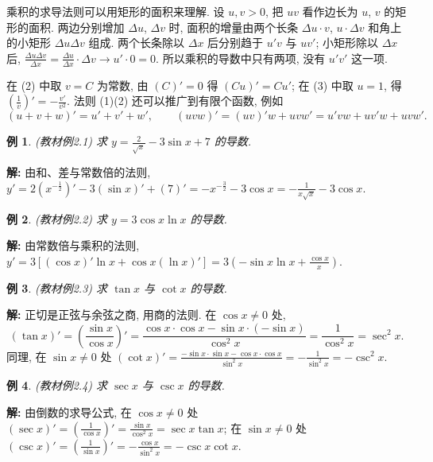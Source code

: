 \documentclass[UTF8,openany]{ctexbook}
\theoremstyle{chinesetextbook}
\newtheorem{example}{例}[section]
\newenvironment{cnsolution}{\par\indent\textbf{解:} \ignorespaces}{\par}
\begin{document}
乘积的求导法则可以用矩形的面积来理解. 设 $u,v>0$, 把 $uv$ 看作边长为 $u$, $v$ 的矩形的面积. 两边分别增加 $\Delta u$, $\Delta v$ 时, 面积的增量由两个长条 $\Delta u\cdot v$, $u\cdot\Delta v$ 和角上的小矩形 $\Delta u\Delta v$ 组成. 两个长条除以 $\Delta x$ 后分别趋于 $u'v$ 与 $uv'$; 小矩形除以 $\Delta x$ 后, $\displaystyle\frac{\Delta u\Delta v}{\Delta x}=\frac{\Delta u}{\Delta x}\cdot\Delta v\to u'\cdot0=0$. 所以乘积的导数中只有两项, 没有 $u'v'$ 这一项.

在 (2) 中取 $v=C$ 为常数, 由 $(C)'=0$ 得 $(Cu)'=Cu'$; 在 (3) 中取 $u=1$, 得 $\displaystyle\left(\frac1v\right)'=-\frac{v'}{v^2}$. 法则 (1)(2) 还可以推广到有限个函数, 例如
\[
(u+v+w)'=u'+v'+w',\qquad(uvw)'=(uv)'w+uvw'=u'vw+uv'w+uvw'.
\]
\begin{example}\label{ex:c2-2-1}
\textnormal{(教材例2.1)} 求 $\displaystyle y=\frac2{\sqrt x}-3\sin x+7$ 的导数.
\end{example}
\begin{cnsolution}
由和、差与常数倍的法则, $\displaystyle y'=2\left(x^{-\frac12}\right)'-3(\sin x)'+(7)'=-x^{-\frac32}-3\cos x=-\frac1{x\sqrt x}-3\cos x$.
\end{cnsolution}
\begin{example}\label{ex:c2-2-2}
\textnormal{(教材例2.2)} 求 $y=3\cos x\ln x$ 的导数.
\end{example}
\begin{cnsolution}
由常数倍与乘积的法则, $\displaystyle y'=3\left[(\cos x)'\ln x+\cos x(\ln x)'\right]=3\left(-\sin x\ln x+\frac{\cos x}x\right)$.
\end{cnsolution}
\begin{example}\label{ex:c2-2-3}
\textnormal{(教材例2.3)} 求 $\tan x$ 与 $\cot x$ 的导数.
\end{example}
\begin{cnsolution}
正切是正弦与余弦之商, 用商的法则. 在 $\cos x\ne0$ 处,
\[
(\tan x)'=\left(\frac{\sin x}{\cos x}\right)'=\frac{\cos x\cdot\cos x-\sin x\cdot(-\sin x)}{\cos^2x}=\frac1{\cos^2x}=\sec^2x.
\]
同理, 在 $\sin x\ne0$ 处 $\displaystyle(\cot x)'=\frac{-\sin x\cdot\sin x-\cos x\cdot\cos x}{\sin^2x}=-\frac1{\sin^2x}=-\csc^2x$.
\end{cnsolution}
\begin{example}\label{ex:c2-2-4}
\textnormal{(教材例2.4)} 求 $\sec x$ 与 $\csc x$ 的导数.
\end{example}
\begin{cnsolution}
由倒数的求导公式, 在 $\cos x\ne0$ 处 $\displaystyle(\sec x)'=\left(\frac1{\cos x}\right)'=\frac{\sin x}{\cos^2x}=\sec x\tan x$; 在 $\sin x\ne0$ 处 $\displaystyle(\csc x)'=\left(\frac1{\sin x}\right)'=-\frac{\cos x}{\sin^2x}=-\csc x\cot x$.
\end{cnsolution}
\end{document}
